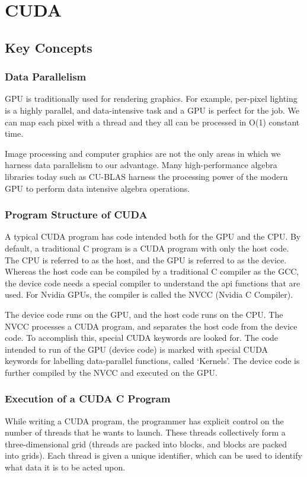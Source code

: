 \documentclass[../notes.tex]{subfiles}
\begin{document}
\section{CUDA}

\subsection{Key Concepts}

\subsubsection{Data Parallelism}
GPU is traditionally used for rendering graphics. For example, per-pixel lighting is a highly parallel, and data-intensive task and a GPU is perfect for the job. We can map each pixel with a thread and they all can be processed in O(1) constant time.

Image processing and computer graphics are not the only areas in which we harness data parallelism to our advantage. Many high-performance algebra libraries today such as CU-BLAS harness the processing power of the modern GPU to perform data intensive algebra operations.

\subsubsection{Program Structure of CUDA}
A typical CUDA program has code intended both for the GPU and the CPU. By default, a traditional C program is a CUDA program with only the host code. The CPU is referred to as the host, and the GPU is referred to as the device. Whereas the host code can be compiled by a traditional C compiler as the GCC, the device code needs a special compiler to understand the api functions that are used. For Nvidia GPUs, the compiler is called the NVCC (Nvidia C Compiler).

The device code runs on the GPU, and the host code runs on the CPU. The NVCC processes a CUDA program, and separates the host code from the device code. To accomplish this, special CUDA keywords are looked for. The code intended to run of the GPU (device code) is marked with special CUDA keywords for labelling data-parallel functions, called ‘Kernels’. The device code is further compiled by the NVCC and executed on the GPU.

\subsubsection{Execution of a CUDA C Program}
While writing a CUDA program, the programmer has explicit control on the number of threads that he wants to launch. These threads collectively form a three-dimensional grid (threads are packed into blocks, and blocks are packed into grids). Each thread is given a unique identifier, which can be used to identify what data it is to be acted upon.
\end{document}
